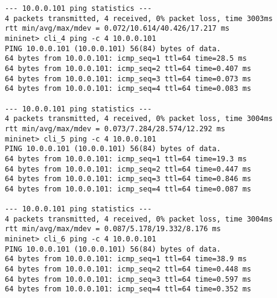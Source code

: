 \documentclass{article}
\begin{document}
\begin{Verbatim}
--- 10.0.0.101 ping statistics ---
4 packets transmitted, 4 received, 0% packet loss, time 3003ms
rtt min/avg/max/mdev = 0.072/10.614/40.426/17.217 ms
mininet> cli_4 ping -c 4 10.0.0.101
PING 10.0.0.101 (10.0.0.101) 56(84) bytes of data.
64 bytes from 10.0.0.101: icmp_seq=1 ttl=64 time=28.5 ms
64 bytes from 10.0.0.101: icmp_seq=2 ttl=64 time=0.407 ms
64 bytes from 10.0.0.101: icmp_seq=3 ttl=64 time=0.073 ms
64 bytes from 10.0.0.101: icmp_seq=4 ttl=64 time=0.083 ms

--- 10.0.0.101 ping statistics ---
4 packets transmitted, 4 received, 0% packet loss, time 3004ms
rtt min/avg/max/mdev = 0.073/7.284/28.574/12.292 ms
mininet> cli_5 ping -c 4 10.0.0.101
PING 10.0.0.101 (10.0.0.101) 56(84) bytes of data.
64 bytes from 10.0.0.101: icmp_seq=1 ttl=64 time=19.3 ms
64 bytes from 10.0.0.101: icmp_seq=2 ttl=64 time=0.447 ms
64 bytes from 10.0.0.101: icmp_seq=3 ttl=64 time=0.846 ms
64 bytes from 10.0.0.101: icmp_seq=4 ttl=64 time=0.087 ms

--- 10.0.0.101 ping statistics ---
4 packets transmitted, 4 received, 0% packet loss, time 3004ms
rtt min/avg/max/mdev = 0.087/5.178/19.332/8.176 ms
mininet> cli_6 ping -c 4 10.0.0.101
PING 10.0.0.101 (10.0.0.101) 56(84) bytes of data.
64 bytes from 10.0.0.101: icmp_seq=1 ttl=64 time=38.9 ms
64 bytes from 10.0.0.101: icmp_seq=2 ttl=64 time=0.448 ms
64 bytes from 10.0.0.101: icmp_seq=3 ttl=64 time=0.597 ms
64 bytes from 10.0.0.101: icmp_seq=4 ttl=64 time=0.352 ms


\end{Verbatim}
\end{document}
